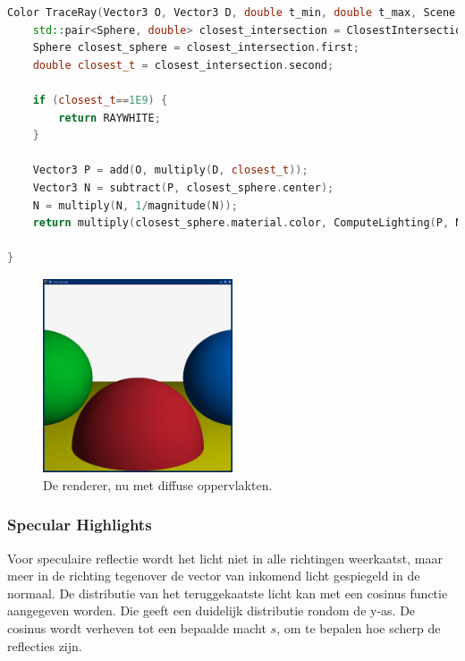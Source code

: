 \documentclass[12pt, a4paper]{article}
\begin{document}
\begin{lstlisting}[language=C++]
Color TraceRay(Vector3 O, Vector3 D, double t_min, double t_max, Scene scene) {   
    std::pair<Sphere, double> closest_intersection = ClosestIntersection(O, D, t_min, t_max, scene);
    Sphere closest_sphere = closest_intersection.first;
    double closest_t = closest_intersection.second;

    if (closest_t==1E9) {
        return RAYWHITE;
    }

    Vector3 P = add(O, multiply(D, closest_t));
    Vector3 N = subtract(P, closest_sphere.center);
    N = multiply(N, 1/magnitude(N));
    return multiply(closest_sphere.material.color, ComputeLighting(P, N, multiply(D, -1), scene));

}
\end{lstlisting}

\begin{figure}[H]
    \centering
    \includegraphics[width=0.50\textwidth]{renders/diffused.png}
    \caption{De renderer, nu met diffuse oppervlakten.}
    \label{fig:diffused}
\end{figure}

\subsubsection{Specular Highlights}

Voor speculaire reflectie wordt het licht niet in alle richtingen weerkaatst, maar meer in de richting tegenover de vector van inkomend licht gespiegeld in de normaal. De distributie van het teruggekaatste licht kan met een cosinus functie aangegeven worden. Die geeft een duidelijk distributie rondom de y-as. De cosinus wordt verheven tot een bepaalde macht $s$, om te bepalen hoe scherp de reflecties zijn.
\end{document}
